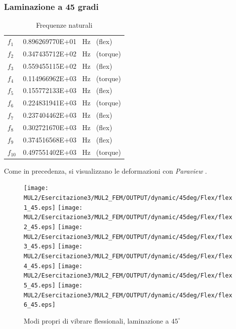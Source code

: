\documentclass{article}
\begin{document}
            \clearpage

            \subsubsection{Laminazione a 45 gradi \label{Esercitazione3_freq_nat_45}}

            \begin{table}[h!]
                \centering
                \begin{tabular}{@{}ll@{}}
                \toprule
                $f_1$    & 0.896269770E+01  \ Hz \ (flex) \\
                $f_2$    & 0.347435712E+02  \ Hz \ (torque) \\
                $f_3$    & 0.559455115E+02  \ Hz \ (flex) \\
                $f_4$    & 0.114966962E+03  \ Hz \ (torque) \\
                $f_5$    & 0.155772133E+03  \ Hz \ (flex) \\
                $f_6$    & 0.224831941E+03  \ Hz \ (torque) \\
                $f_7$    & 0.237404462E+03  \ Hz \ (flex) \\
                $f_8$    & 0.302721670E+03  \ Hz \ (flex) \\
                $f_9$    & 0.374516568E+03  \ Hz \ (flex) \\
                $f_{10}$ & 0.497551402E+03  \ Hz \ (torque) \\ \bottomrule
            \end{tabular}
            \caption{Frequenze naturali}
            \label{tab:freq_nat_45}
            \end{table}
        
        Come in precedenza, si visualizzano le deformazioni con \textit{Paraview} \autocite{Paraview}. 

        \clearpage

        \begin{figure}[h!]
             \label{fig:freq_nat_flex_45}
            \texttt{[image: MUL2/Esercitazione3/MUL2\_FEM/OUTPUT/dynamic/45deg/Flex/flex1\_45.eps]}
            \texttt{[image: MUL2/Esercitazione3/MUL2\_FEM/OUTPUT/dynamic/45deg/Flex/flex2\_45.eps]}
            \texttt{[image: MUL2/Esercitazione3/MUL2\_FEM/OUTPUT/dynamic/45deg/Flex/flex3\_45.eps]}
            \texttt{[image: MUL2/Esercitazione3/MUL2\_FEM/OUTPUT/dynamic/45deg/Flex/flex4\_45.eps]}
            \texttt{[image: MUL2/Esercitazione3/MUL2\_FEM/OUTPUT/dynamic/45deg/Flex/flex5\_45.eps]}
            \texttt{[image: MUL2/Esercitazione3/MUL2\_FEM/OUTPUT/dynamic/45deg/Flex/flex6\_45.eps]}
            \caption{Modi propri di vibrare flessionali, laminazione a $45^\circ$}
        \end{figure}
\end{document}
